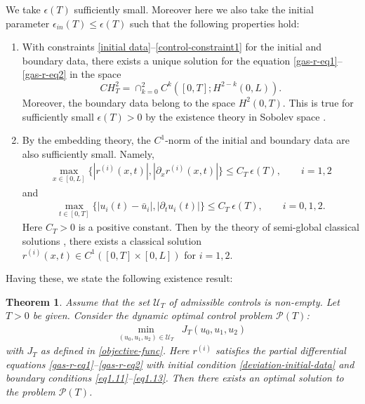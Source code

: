 \documentclass[12pt]{article}
\newtheorem{theorem}{Theorem}[section]
\numberwithin{equation}{section}
\begin{document}
We take $\epsilon(T)$ sufficiently small. Moreover here we also take the initial  parameter $\epsilon_{in}(T)\leq \epsilon(T)$ such that the following properties hold: 
\begin{enumerate}
    \item[(1)] With constraints \eqref{initial data}--\eqref{control-constraint1} for the initial and boundary data, there exists a unique solution for the equation \eqref{gas-r-eq1}--\eqref{gas-r-eq2} in the space
$$
CH_T^2=\cap_{k=0}^2 C^k([0,T];H^{2-k}(0,L)).
$$ 
Moreover, the boundary data belong to the space $H^2(0,T)$.
This is true for sufficiently small $\epsilon(T)>0$ by the existence theory in Sobolev space \cite{Coron-book,ExistenceHyperbolic}.
\item[(2)] By the embedding theory, the $C^1$-norm of the initial and boundary data are also sufficiently small. Namely, 
\begin{align}\label{control-constraint2}
\max_{x\in [0,L]}\{ |r^{(i)}(x,t)|,|\partial_x r^{(i)}(x,t)|\}\leq C_T~\epsilon(T),\qquad i=1,2
\end{align}
and
\begin{align}\label{control-constraint3}
\max_{t\in[0,T]}\{ |u_i(t)-\bar{u}_i|,|\partial_t u_i(t)|\}\leq C_T~\epsilon(T),\qquad i=0,1,2.
\end{align}
Here $C_T>0$ is a positive constant.
Then by the theory of semi-global classical solutions \cite{MR2655971},  there exists a classical solution $r^{(i)}(x,t)\in C^1([0,T]\times [0,L])$ for $i=1,2$.
\end{enumerate}




Having these, we state the following existence result: 
\begin{theorem}
Assume that the set $\mathcal{U}_T$ of admissible controls is non-empty. Let $T > 0$ be given.
Consider the dynamic optimal control problem $\mathcal{P}(T)$:
\begin{align*}
\min_{(u_0, u_1, u_2)\in \mathcal{U}_T} &
J_T(u_0, u_1, u_2)
\end{align*}
with $J_T$ as defined in \eqref{objective-func}.
Here $r^{(i)}$ satisfies the partial differential equations \eqref{gas-r-eq1}--\eqref{gas-r-eq2} with initial condition \eqref{deviation-initial-data} and boundary conditions \eqref{eq1.11}--\eqref{eq1.13}. Then there exists an optimal solution to the problem $\mathcal{P}(T)$. 
\end{theorem}
\end{document}
